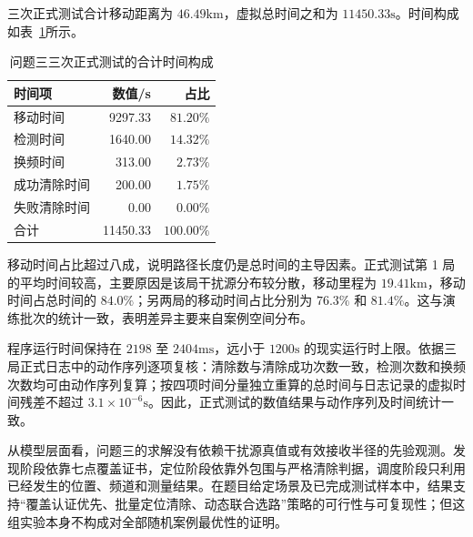 三次正式测试合计移动距离为 $46.49\mathrm{km}$，虚拟总时间之和为 $11450.33\mathrm{s}$。时间构成如表~\ref{tab:q3_time}所示。

\begin{table}[htbp]
\centering
\caption{问题三三次正式测试的合计时间构成}
\label{tab:q3_time}
\begin{tabular}{lrr}
\toprule
时间项 & 数值/s & 占比 \\
\midrule
移动时间 & 9297.33 & $81.20\%$ \\
检测时间 & 1640.00 & $14.32\%$ \\
换频时间 & 313.00 & $2.73\%$ \\
成功清除时间 & 200.00 & $1.75\%$ \\
失败清除时间 & 0.00 & $0.00\%$ \\
\midrule
合计 & 11450.33 & $100.00\%$ \\
\bottomrule
\end{tabular}
\end{table}

移动时间占比超过八成，说明路径长度仍是总时间的主导因素。正式测试第 1 局的平均时间较高，主要原因是该局干扰源分布较分散，移动里程为 $19.41\mathrm{km}$，移动时间占总时间的 $84.0\%$；另两局的移动时间占比分别为 $76.3\%$ 和 $81.4\%$。这与演练批次的统计一致，表明差异主要来自案例空间分布。

程序运行时间保持在 $2198$ 至 $2404\mathrm{ms}$，远小于 $1200\mathrm{s}$ 的现实运行时上限。依据三局正式日志中的动作序列逐项复核：清除数与清除成功次数一致，检测次数和换频次数均可由动作序列复算；按四项时间分量独立重算的总时间与日志记录的虚拟时间残差不超过 $3.1\times10^{-6}\mathrm{s}$。因此，正式测试的数值结果与动作序列及时间统计一致。

从模型层面看，问题三的求解没有依赖干扰源真值或有效接收半径的先验观测。发现阶段依靠七点覆盖证书，定位阶段依靠外包围与严格清除判据，调度阶段只利用已经发生的位置、频道和测量结果。在题目给定场景及已完成测试样本中，结果支持“覆盖认证优先、批量定位清除、动态联合选路”策略的可行性与可复现性；但这组实验本身不构成对全部随机案例最优性的证明。

